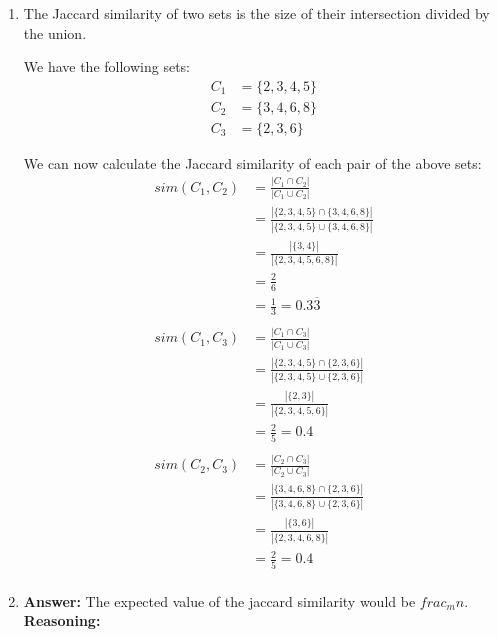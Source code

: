 \documentclass{article}
\begin{document}
    \begin{enumerate}[label=\alph*., left=10pt, itemsep=10pt]

        \item \begin{minipage}[t]{0.9\textwidth}
            The Jaccard similarity of two sets is the size of their intersection divided by the union.
            
            We have the following sets:
            \begin{align*}
                C_{1} &= \{2,3,4,5\}\\
                C_{2} &= \{3,4,6,8\}\\
                C_{3} &= \{2,3,6\}
            \end{align*}
            
            We can now calculate the Jaccard similarity of each pair of the above sets:
            \begin{align*}
                sim(C_{1},C_{2}) &= \frac{|C_{1} \cap C_{2}|}{|C_{1} \cup C_{2}|}\\
                                 &= \frac{|\{2,3,4,5\} \cap \{3,4,6,8\}|}{|\{2,3,4,5\} \cup \{3,4,6,8\}|}\\
                                 &= \frac{|\{3,4\}|}{|\{2,3,4,5,6,8\}|}\\
                                 &= \frac{2}{6}\\
                                 &= \frac{1}{3} = 0.3\overline{3}\\
                \\
                sim(C_{1},C_{3}) &= \frac{|C_{1} \cap C_{3}|}{|C_{1} \cup C_{3}|}\\
                                 &= \frac{|\{2,3,4,5\} \cap \{2,3,6\}|}{|\{2,3,4,5\} \cup \{2,3,6\}|}\\
                                 &= \frac{|\{2,3\}|}{|\{2,3,4,5,6\}|}\\
                                 &= \frac{2}{5} = 0.4\\
                \\
                sim(C_{2},C_{3}) &= \frac{|C_{2} \cap C_{3}|}{|C_{2} \cup C_{3}|}\\
                                 &= \frac{|\{3,4,6,8\} \cap \{2,3,6\}|}{|\{3,4,6,8\} \cup \{2,3,6\}|}\\
                                 &= \frac{|\{3,6\}|}{|\{2,3,4,6,8\}|}\\
                                 &= \frac{2}{5} = 0.4\\
            \end{align*}
        \end{minipage}
        \item \begin{minipage}[t]{0.9\textwidth}
            \textbf{Answer:} The expected value of the jaccard similarity would be $frac_{m}{n}$.\\

            \textbf{Reasoning:} 
        \end{minipage}

    \end{enumerate}
\end{document}
